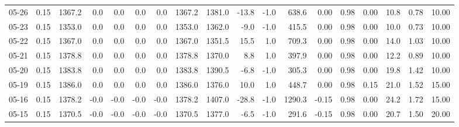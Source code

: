 \begin{threeparttable}
{\begin{tabular}{lrrrrrrrrrrrrrrrrr}
  05-26 &     0.15 & 1367.2 &               0.0 &               0.0 &                0.0 &                0.0 & 1367.2 & 1381.0 &      -13.8 &                     -1.0 &               638.6 &       0.00 &      0.98 &           0.00 &             10.8 &            0.78 &                  10.00 \\
  05-23 &     0.15 & 1353.0 &               0.0 &               0.0 &                0.0 &                0.0 & 1353.0 & 1362.0 &       -9.0 &                     -1.0 &               415.5 &       0.00 &      0.98 &           0.00 &             10.0 &            0.73 &                  10.00 \\
  05-22 &     0.15 & 1367.0 &               0.0 &               0.0 &                0.0 &                0.0 & 1367.0 & 1351.5 &       15.5 &                      1.0 &               709.3 &       0.00 &      0.98 &           0.00 &             14.0 &            1.03 &                  10.00 \\
  05-21 &     0.15 & 1378.8 &               0.0 &               0.0 &                0.0 &                0.0 & 1378.8 & 1370.0 &        8.8 &                      1.0 &               397.9 &       0.00 &      0.98 &           0.00 &             12.2 &            0.89 &                  10.00 \\
  05-20 &     0.15 & 1383.8 &               0.0 &               0.0 &                0.0 &                0.0 & 1383.8 & 1390.5 &       -6.8 &                     -1.0 &               305.3 &       0.00 &      0.98 &           0.00 &             19.8 &            1.42 &                  10.00 \\
  05-19 &     0.15 & 1386.0 &               0.0 &               0.0 &                0.0 &                0.0 & 1386.0 & 1376.0 &       10.0 &                      1.0 &               448.7 &       0.00 &      0.98 &           0.15 &             21.0 &            1.52 &                  15.00 \\
  05-16 &     0.15 & 1378.2 &              -0.0 &              -0.0 &               -0.0 &               -0.0 & 1378.2 & 1407.0 &      -28.8 &                     -1.0 &              1290.3 &      -0.15 &      0.98 &           0.00 &             24.2 &            1.72 &                  15.00 \\
  05-15 &     0.15 & 1370.5 &              -0.0 &              -0.0 &               -0.0 &               -0.0 & 1370.5 & 1377.0 &       -6.5 &                     -1.0 &               291.6 &      -0.15 &      0.98 &           0.00 &             20.7 &            1.50 &                  20.00 \\

\end{tabular}}
\end{threeparttable}
